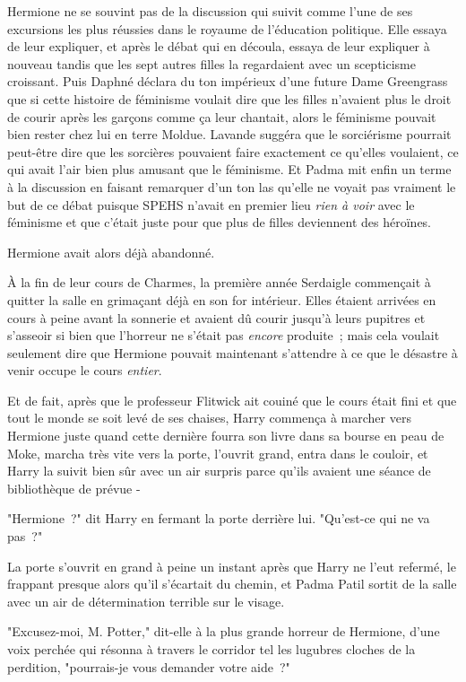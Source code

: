 Hermione ne se souvint pas de la discussion qui suivit comme l'une de ses excursions les plus réussies dans le royaume de l'éducation politique. Elle essaya de leur expliquer, et après le débat qui en découla, essaya de leur expliquer à nouveau tandis que les sept autres filles la regardaient avec un scepticisme croissant. Puis Daphné déclara du ton impérieux d'une future Dame Greengrass que si cette histoire de féminisme voulait dire que les filles n'avaient plus le droit de courir après les garçons comme ça leur chantait, alors le féminisme pouvait bien rester chez lui en terre Moldue. Lavande suggéra que le sorciérisme pourrait peut-être dire que les sorcières pouvaient faire exactement ce qu'elles voulaient, ce qui avait l'air bien plus amusant que le féminisme. Et Padma mit enfin un terme à la discussion en faisant remarquer d'un ton las qu'elle ne voyait pas vraiment le but de ce débat puisque SPEHS n'avait en premier lieu \emph{rien à voir} avec le féminisme et que c'était juste pour que plus de filles deviennent des héroïnes.

Hermione avait alors déjà abandonné.

\later

À la fin de leur cours de Charmes, la première année Serdaigle commençait à quitter la salle en grimaçant déjà en son for intérieur. Elles étaient arrivées en cours à peine avant la sonnerie et avaient dû courir jusqu'à leurs pupitres et s'asseoir si bien que l'horreur ne s'était pas \emph{encore} produite~; mais cela voulait seulement dire que Hermione pouvait maintenant s'attendre à ce que le désastre à venir occupe le cours \emph{entier}.

Et de fait, après que le professeur Flitwick ait couiné que le cours était fini et que tout le monde se soit levé de ses chaises, Harry commença à marcher vers Hermione juste quand cette dernière fourra son livre dans sa bourse en peau de Moke, marcha très vite vers la porte, l'ouvrit grand, entra dans le couloir, et Harry la suivit bien sûr avec un air surpris parce qu'ils avaient une séance de bibliothèque de prévue -

"Hermione~?" dit Harry en fermant la porte derrière lui. "Qu'est-ce qui ne va pas~?"

La porte s'ouvrit en grand à peine un instant après que Harry ne l'eut refermé, le frappant presque alors qu'il s'écartait du chemin, et Padma Patil sortit de la salle avec un air de détermination terrible sur le visage.

"Excusez-moi, M. Potter," dit-elle à la plus grande horreur de Hermione, d'une voix perchée qui résonna à travers le corridor tel les lugubres cloches de la perdition, "pourrais-je vous demander votre aide~?"

